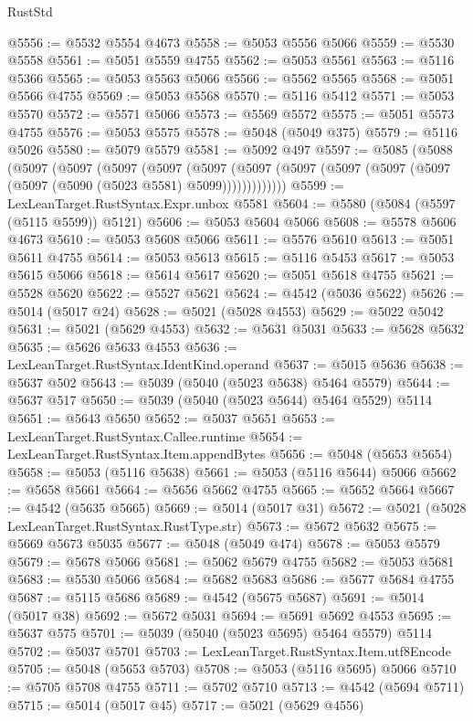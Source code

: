 \begin{lexlean}{RustStd}
\begin{coremodule}
@5556 := @5532 @5554 @4673
@5558 := @5053 @5556 @5066
@5559 := @5530 @5558
@5561 := @5051 @5559 @4755
@5562 := @5053 @5561
@5563 := @5116 @5366
@5565 := @5053 @5563 @5066
@5566 := @5562 @5565
@5568 := @5051 @5566 @4755
@5569 := @5053 @5568
@5570 := @5116 @5412
@5571 := @5053 @5570
@5572 := @5571 @5066
@5573 := @5569 @5572
@5575 := @5051 @5573 @4755
@5576 := @5053 @5575
@5578 := @5048 (@5049 @375)
@5579 := @5116 @5026
@5580 := @5079 @5579
@5581 := @5092 @497
@5597 := @5085
    (@5088
      (@5097
        (@5097
          (@5097
            (@5097
              (@5097
                (@5097 (@5097 (@5097 (@5097 (@5097 (@5097 (@5090 (@5023 @5581) @5099)))))))))))))
@5599 := LexLeanTarget.RustSyntax.Expr.unbox @5581
@5604 := @5580 (@5084 (@5597 (@5115 @5599)) @5121)
@5606 := @5053 @5604 @5066
@5608 := @5578 @5606 @4673
@5610 := @5053 @5608 @5066
@5611 := @5576 @5610
@5613 := @5051 @5611 @4755
@5614 := @5053 @5613
@5615 := @5116 @5453
@5617 := @5053 @5615 @5066
@5618 := @5614 @5617
@5620 := @5051 @5618 @4755
@5621 := @5528 @5620
@5622 := @5527 @5621
@5624 := @4542 (@5036 @5622)
@5626 := @5014 (@5017 @24)
@5628 := @5021 (@5028 @4553)
@5629 := @5022 @5042
@5631 := @5021 (@5629 @4553)
@5632 := @5631 @5031
@5633 := @5628 @5632
@5635 := @5626 @5633 @4553
@5636 := LexLeanTarget.RustSyntax.IdentKind.operand
@5637 := @5015 @5636
@5638 := @5637 @502
@5643 := @5039 (@5040 (@5023 @5638) @5464 @5579)
@5644 := @5637 @517
@5650 := @5039 (@5040 (@5023 @5644) @5464 @5529) @5114
@5651 := @5643 @5650
@5652 := @5037 @5651
@5653 := LexLeanTarget.RustSyntax.Callee.runtime
@5654 := LexLeanTarget.RustSyntax.Item.appendBytes
@5656 := @5048 (@5653 @5654)
@5658 := @5053 (@5116 @5638)
@5661 := @5053 (@5116 @5644) @5066
@5662 := @5658 @5661
@5664 := @5656 @5662 @4755
@5665 := @5652 @5664
@5667 := @4542 (@5635 @5665)
@5669 := @5014 (@5017 @31)
@5672 := @5021 (@5028 LexLeanTarget.RustSyntax.RustType.str)
@5673 := @5672 @5632
@5675 := @5669 @5673 @5035
@5677 := @5048 (@5049 @474)
@5678 := @5053 @5579
@5679 := @5678 @5066
@5681 := @5062 @5679 @4755
@5682 := @5053 @5681
@5683 := @5530 @5066
@5684 := @5682 @5683
@5686 := @5677 @5684 @4755
@5687 := @5115 @5686
@5689 := @4542 (@5675 @5687)
@5691 := @5014 (@5017 @38)
@5692 := @5672 @5031
@5694 := @5691 @5692 @4553
@5695 := @5637 @575
@5701 := @5039 (@5040 (@5023 @5695) @5464 @5579) @5114
@5702 := @5037 @5701
@5703 := LexLeanTarget.RustSyntax.Item.utf8Encode
@5705 := @5048 (@5653 @5703)
@5708 := @5053 (@5116 @5695) @5066
@5710 := @5705 @5708 @4755
@5711 := @5702 @5710
@5713 := @4542 (@5694 @5711)
@5715 := @5014 (@5017 @45)
@5717 := @5021 (@5629 @4556)

\end{coremodule}
\end{lexlean}
